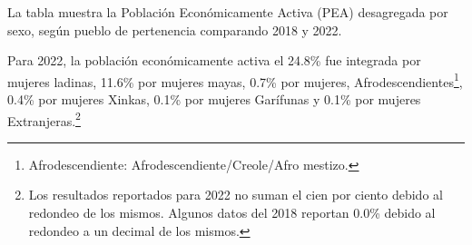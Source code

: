 La tabla muestra la Población Económicamente Activa (PEA) desagregada por sexo, según pueblo de pertenencia comparando 2018 y 2022.

Para 2022, la población económicamente activa el 24.8\% fue integrada por mujeres ladinas, 11.6\% por mujeres mayas, 0.7\% por mujeres, Afrodescendientes\footnote{Afrodescendiente: Afrodescendiente/Creole/Afro mestizo.}, 0.4\% por mujeres Xinkas, 0.1\% por mujeres Garífunas y 0.1\% por mujeres Extranjeras.\footnote{Los resultados reportados para 2022 no suman el cien por ciento debido al redondeo de los mismos. Algunos datos del 2018 reportan 0.0\% debido al redondeo a un decimal de los mismos.}
